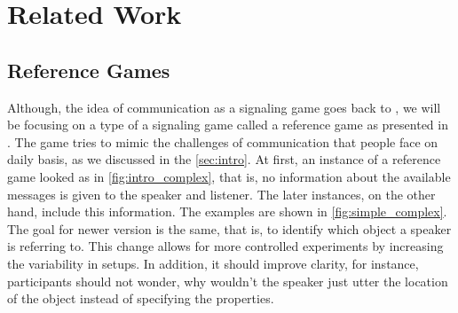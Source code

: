 ﻿\chapter{Related Work}
\section{Reference Games}
Although, the idea of communication as a signaling game goes back to \cite{Lewis_1969}, we will be focusing on a type of a signaling game called a reference game as presented in \cite{Frank_2012}. The game tries to mimic the challenges of communication that people face on daily basis, as we discussed in the \autoref{sec:intro}. At first, an instance of a reference game looked as in \autoref{fig:intro_complex}, that is, no information about the available messages is given to the speaker and listener. The later instances, on the other hand, include this information. The examples are shown in \autoref{fig:simple_complex}. The goal for newer version is the same, that is, to identify which object a speaker is referring to. This change allows for more controlled experiments by increasing the variability in setups. In addition, it should improve clarity, for instance, participants should not wonder, why wouldn't the speaker just utter the location of the object instead of specifying the properties.

